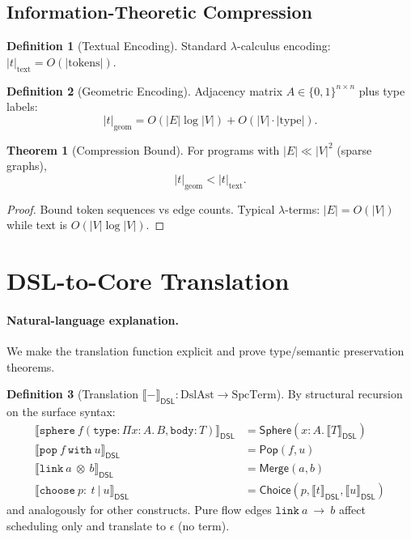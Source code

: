 \documentclass[12pt]{article}
\newcommand{\Sphere}{\mathsf{Sphere}}
\newcommand{\Pop}{\mathsf{Pop}}
\newcommand{\Merge}{\mathsf{Merge}}
\newcommand{\Choice}{\mathsf{Choice}}
\newcommand{\PiT}[3]{\Pi #1 : #2.\, #3}
\newcommand{\Interp}[1]{\llbracket #1 \rrbracket}
\theoremstyle{definition}
\newtheorem{definition}{Definition}
\newtheorem{theorem}{Theorem}
\begin{document}
\subsection{Information-Theoretic Compression}
\begin{definition}[Textual Encoding]
Standard $\lambda$-calculus encoding: $|t|_{\text{text}} = O(|\text{tokens}|)$.
\end{definition}

\begin{definition}[Geometric Encoding]
Adjacency matrix $A \in \{0,1\}^{n \times n}$ plus type labels:
$$|t|_{\text{geom}} = O(|E| \log |V|) + O(|V| \cdot |\text{type}|).$$
\end{definition}

\begin{theorem}[Compression Bound]
For programs with $|E| \ll |V|^2$ (sparse graphs),
$$|t|_{\text{geom}} < |t|_{\text{text}}.$$
\end{theorem}
\begin{proof}
Bound token sequences vs edge counts. Typical $\lambda$-terms: $|E| = O(|V|)$ while text is $O(|V| \log |V|)$.
\end{proof}

\section{DSL-to-Core Translation}
\paragraph{Natural-language explanation.}
We make the translation function explicit and prove type/semantic preservation theorems.

\begin{definition}[Translation $\Interp{-}_{\mathsf{DSL}} : \mathrm{DslAst} \to \mathrm{SpcTerm}$]
By structural recursion on the surface syntax:
\begin{align*}
\Interp{\texttt{sphere}\ f(\texttt{type}:\PiT{x}{A}{B}, \texttt{body}:T)}_{\mathsf{DSL}} &= \Sphere(x\!:\!A.\,\Interp{T}_{\mathsf{DSL}})\\
\Interp{\texttt{pop}\ f\ \texttt{with}\ u}_{\mathsf{DSL}} &= \Pop(f,u)\\
\Interp{\texttt{link}\ a\ \otimes\ b}_{\mathsf{DSL}} &= \Merge(a,b)\\
\Interp{\texttt{choose}\ p:\ t\ |\ u}_{\mathsf{DSL}} &= \Choice(p,\Interp{t}_{\mathsf{DSL}},\Interp{u}_{\mathsf{DSL}})
\end{align*}
and analogously for other constructs. Pure flow edges $\texttt{link}\ a\ \to\ b$ affect scheduling only and translate to $\epsilon$ (no term).
\end{definition}
\end{document}
